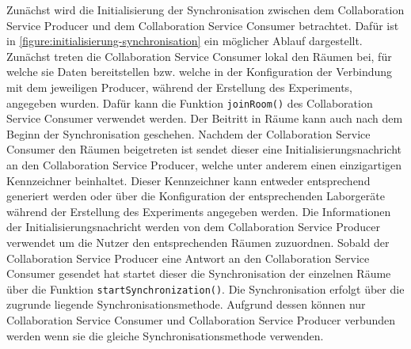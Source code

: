 Zunächst wird die Initialisierung der Synchronisation zwischen dem Collaboration Service Producer und dem Collaboration Service Consumer betrachtet. Dafür ist in \autoref{figure:initialisierung-synchronisation} ein möglicher Ablauf dargestellt. Zunächst treten die Collaboration Service Consumer lokal den Räumen bei, für welche sie Daten bereitstellen bzw. welche in der Konfiguration der Verbindung mit dem jeweiligen Producer, während der Erstellung des Experiments, angegeben wurden. Dafür kann die Funktion \texttt{joinRoom()} des Collaboration Service Consumer verwendet werden. Der Beitritt in Räume kann auch nach dem Beginn der Synchronisation geschehen. Nachdem der Collaboration Service Consumer den Räumen beigetreten ist sendet dieser eine Initialisierungsnachricht an den Collaboration Service Producer, welche unter anderem einen einzigartigen Kennzeichner beinhaltet. Dieser Kennzeichner kann entweder entsprechend generiert werden oder über die Konfiguration der entsprechenden Laborgeräte während der Erstellung des Experiments angegeben werden. Die Informationen der Initialisierungsnachricht werden von dem Collaboration Service Producer verwendet um die Nutzer den entsprechenden Räumen zuzuordnen. Sobald der Collaboration Service Producer eine Antwort an den Collaboration Service Consumer gesendet hat startet dieser die Synchronisation der einzelnen Räume über die Funktion \texttt{startSynchronization()}. Die Synchronisation erfolgt über die zugrunde liegende Synchronisationsmethode. Aufgrund dessen können nur Collaboration Service Consumer und Collaboration Service Producer verbunden werden wenn sie die gleiche Synchronisationsmethode verwenden.


